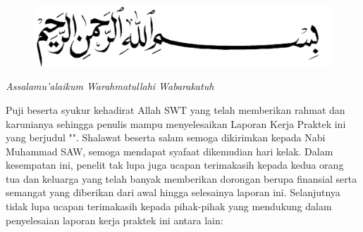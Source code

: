 %



\chapter*{\kataPengantar}
\begin{figure}
    \centering
    \includegraphics[width=0.5\linewidth]{pngwing.com (2).png}
\end{figure}

\textit{Assalamu’alaikum Warahmatullahi Wabarakatuh} 
\par Puji beserta syukur kehadirat Allah SWT yang telah memberikan rahmat dan karunianya sehingga penulis mampu menyelesaikan Laporan Kerja Praktek ini yang berjudul "\judul". Shalawat beserta salam semoga dikirimkan kepada Nabi Muhammad SAW, semoga mendapat syafaat dikemudian hari kelak. Dalam kesempatan ini, penelit tak lupa juga ucapan terimakasih kepada kedua orang tua dan keluarga yang telah banyak memberikan dorongan berupa finansial serta semangat yang diberikan dari awal hingga selesainya laporan ini. Selanjutnya tidak lupa ucapan terimakasih kepada pihak-pihak yang mendukung dalam penyelesaian laporan kerja praktek ini antara lain:

